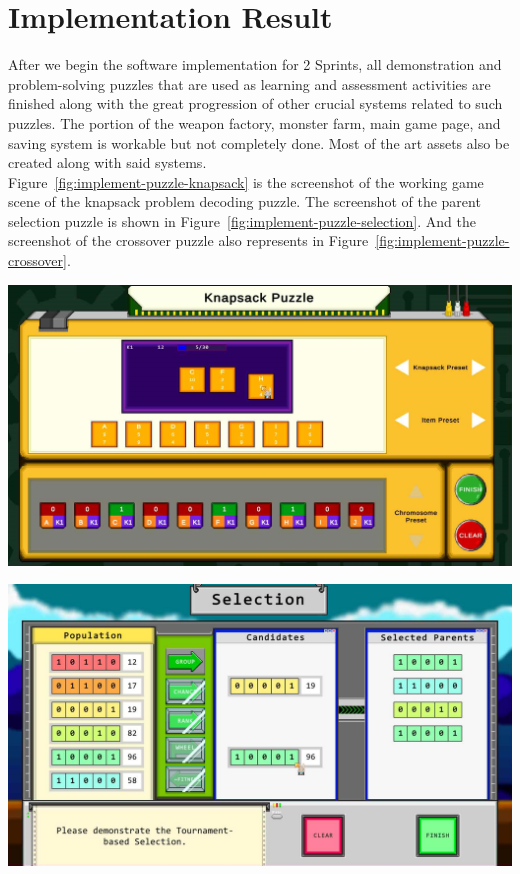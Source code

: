 \documentclass[12pt,oneside,openright,a4paper]{cpe-english-project}
\begin{document}
\section{Implementation Result}
After we begin the software implementation for 2 Sprints, all demonstration and problem-solving puzzles that are used as learning and assessment activities are finished along with the great progression of other crucial systems related to such puzzles. The portion of the weapon factory, monster farm, main game page, and saving system is workable but not completely done. Most of the art assets also be created along with said systems. \\
Figure~\ref{fig:implement-puzzle-knapsack} is the screenshot of the working game scene of the knapsack problem decoding puzzle. The screenshot of the parent selection puzzle is shown in Figure~\ref{fig:implement-puzzle-selection}. And the screenshot of the crossover puzzle also represents in Figure~\ref{fig:implement-puzzle-crossover}.  \\

\begin{minipage}[c]{\textwidth}\centering
\includegraphics[width=14cm]{figure/implement-puzzle-knapsack.png}
\label{fig:implement-puzzle-knapsack}
\end{minipage}
\begin{minipage}[c]{\textwidth}\centering
\includegraphics[width=14cm]{figure/implement-puzzle-selection.png}
\label{fig:implement-puzzle-selection}
\end{minipage}
\end{document}
